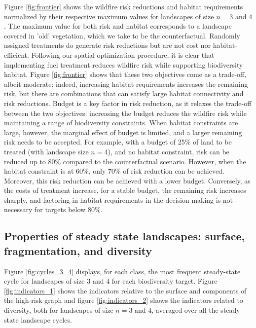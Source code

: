 Figure \ref{fig:frontier} shows the wildfire risk reductions and habitat requirements normalized by their respective maximum values for landscapes of size $n=3$ and $4$. The maximum value for both risk and habitat corresponds to a landscape covered in 'old' vegetation, which we take to be the counterfactual. 
Randomly assigned treatments do generate risk reductions but are not cost nor habitat-efficient. Following our spatial optimization procedure, it is clear that implementing fuel treatment reduces wildfire risk while supporting biodiversity habitat. Figure \ref{fig:frontier} shows that these two objectives come as a trade-off, albeit moderate: indeed, increasing habitat requirements increases the remaining risk, but there are combinations that can satisfy large habitat connectivity and risk reductions. 
Budget is a key factor in risk reduction, as it relaxes the trade-off between the two objectives: increasing the budget reduces the wildfire risk while maintaining a range of biodiversity constraints. When habitat constraints are large, however, the marginal effect of budget is limited, and a larger remaining risk needs to be accepted. For example, with a budget of 25\% of land to be treated (with landscape size $n=4$), and no habitat constraint, risk can be reduced up to 80\% compared to the counterfactual scenario. However, when the habitat constraint is at 60\%, only 70\% of risk reduction can be achieved. Moreover, this risk reduction can be achieved with a lower budget. Conversely, as the costs of treatment increase, for a stable budget, the remaining risk increases sharply, and factoring in habitat requirements in the decision-making is not necessary for targets below 80\%. 

\subsection{Properties of steady state landscapes: surface, fragmentation, and diversity}
Figure \ref{fig:cycles_3_4} displays, for each class, the most frequent steady-state cycle for landscapes of size $3$ and $4$ for each biodiversity target. 
Figure \ref{fig:indicators_1} shows the indicators relative to the surface and components of the high-risk graph and figure \ref{fig:indicators_2} shows the indicators related to diversity, both for landscapes of size $n=3$ and $4$, averaged over all the steady-state landscape cycles. 


